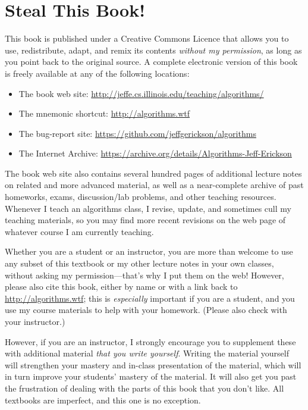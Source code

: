\section*{Steal This Book!}

This book is published under a Creative Commons Licence that allows you to use, redistribute, adapt, and remix its contents \textit{without my permission}, as long as you point back to the original source. A complete electronic version of this book is freely available at any of the following locations:
\begin{itemize}
\item The book web site: {\url{http://jeffe.cs.illinois.edu/teaching/algorithms/}}
\item The mnemonic shortcut: {\url{http://algorithms.wtf}}
\item The bug-report site: {\url{https://github.com/jeffgerickson/algorithms}}
\item The Internet Archive: {\url{https://archive.org/details/Algorithms-Jeff-Erickson}}
\end{itemize}

The book web site also contains several hundred pages of additional lecture notes on related and more advanced material, as well as a near-complete archive of past homeworks, exams, discussion/lab problems, and other teaching resources. Whenever I teach an algorithms class, I revise, update, and sometimes cull my teaching materials, so you may find more recent revisions on the web page of whatever course I am currently teaching.

Whether you are a student or an instructor, you are more than welcome to use any subset of this textbook or my other lecture notes in your own classes, without asking my permission—that’s why I put them on the web! However, please also cite this book, either by name or with a link back to {\url{http://algorithms.wtf}}; this is \textit{especially} important if you are a student, and you use my course materials to help with your homework. (Please also check with your instructor.)

However, if you are an instructor, I strongly encourage you to supplement these with additional material \textit{that you write yourself}. Writing the material yourself will strengthen your mastery and in-class presentation of the material, which will in turn improve your students’ mastery of the material. It will also get you past the frustration of dealing with the parts of this book that you don’t like. All textbooks are \mbox{\settowidth{\dimen0}{crap}\raisebox{0.45ex}{\rule{\dimen0}{0.4pt}}} imperfect, and this one is no exception.

